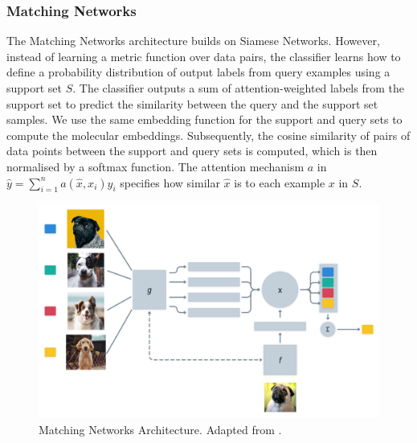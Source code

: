\subsubsection{Matching Networks}

The Matching Networks architecture builds on Siamese Networks. However, instead of learning a metric function over data pairs, the classifier learns how to define a probability distribution of output labels from query examples using a support set $S$. The classifier outputs a sum of attention-weighted labels from the support set to predict the similarity between the query and the support set samples. We use the same embedding function for the support and query sets to compute the molecular embeddings. Subsequently, the cosine similarity of pairs of data points between the support and query sets is computed, which is then normalised by a softmax function. The attention mechanism $a$ in $\hat{y} = \sum_{i=1}^{n} a(\hat{x}, x_i)y_i$ specifies how similar $\hat{x}$ is to each example $x$ in $S$.

\begin{figure}[!ht]
    \centering
    \includegraphics[width=0.7\linewidth]{img/matching_networks_adapt.png}
    \caption[Matching Networks Architecture]{Matching Networks Architecture. Adapted from \citet{vinyals2016matching}.}
    \label{fig:matchingnets}
\end{figure}

